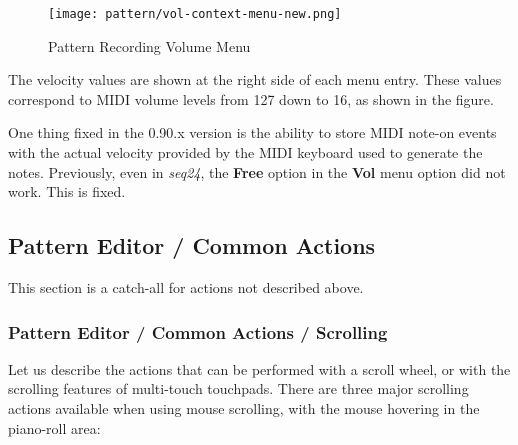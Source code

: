 \begin{figure}[H]
   \centering 
   \texttt{[image: pattern/vol-context-menu-new.png]}
   \caption{Pattern Recording Volume Menu}
   \label{fig:pattern_edit_recording_volume_menu}
\end{figure}

   The velocity values are shown at the right side of each menu entry.
   These values correspond to MIDI volume levels from 127 down to 16, as
   shown in the figure.

   One thing fixed in the 0.90.x version is the ability to store MIDI note-on
   events with the actual velocity provided by the MIDI keyboard used to
   generate the notes.  Previously, even in \textsl{seq24},
   the \textbf{Free} option in the \textbf{Vol} menu option did not work.
   This is fixed.

\subsection{Pattern Editor / Common Actions}
\label{subsec:seq64_pattern_editor_common}

   This section is a catch-all for actions not described above.

\subsubsection{Pattern Editor / Common Actions / Scrolling}
\label{subsec:seq64_pattern_editor_scrolling}

   Let us describe the actions that can be performed with a
   scroll wheel, or with the scrolling features of multi-touch touchpads.
   There are three major scrolling actions available when using mouse
   scrolling, with the mouse hovering in the piano-roll area:

